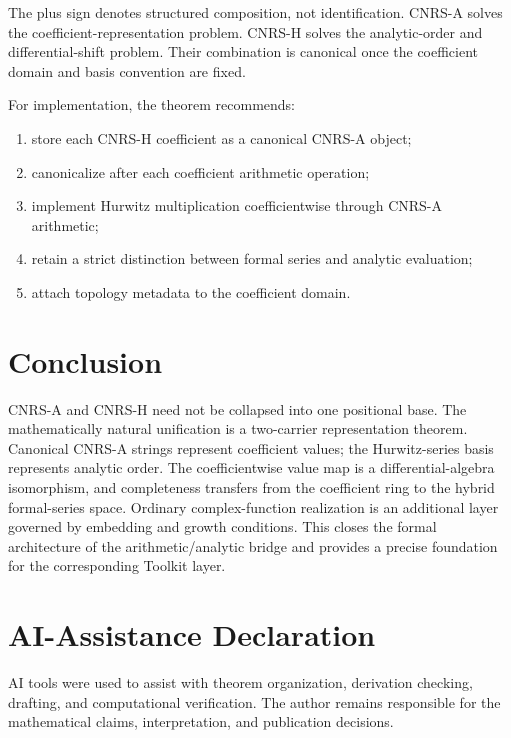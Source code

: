 \documentclass[11pt]{article}
\begin{document}
The plus sign denotes structured composition, not identification.  CNRS-A solves the coefficient-representation problem.  CNRS-H solves the analytic-order and differential-shift problem.  Their combination is canonical once the coefficient domain and basis convention are fixed.

For implementation, the theorem recommends:
\begin{enumerate}
\item store each CNRS-H coefficient as a canonical CNRS-A object;
\item canonicalize after each coefficient arithmetic operation;
\item implement Hurwitz multiplication coefficientwise through CNRS-A arithmetic;
\item retain a strict distinction between formal series and analytic evaluation;
\item attach topology metadata to the coefficient domain.
\end{enumerate}

\section{Conclusion}

CNRS-A and CNRS-H need not be collapsed into one positional base.  The mathematically natural unification is a two-carrier representation theorem.  Canonical CNRS-A strings represent coefficient values; the Hurwitz-series basis represents analytic order.  The coefficientwise value map is a differential-algebra isomorphism, and completeness transfers from the coefficient ring to the hybrid formal-series space.  Ordinary complex-function realization is an additional layer governed by embedding and growth conditions.  This closes the formal architecture of the arithmetic/analytic bridge and provides a precise foundation for the corresponding Toolkit layer.

\section*{AI-Assistance Declaration}
AI tools were used to assist with theorem organization, derivation checking, drafting, and computational verification.  The author remains responsible for the mathematical claims, interpretation, and publication decisions.
\end{document}
